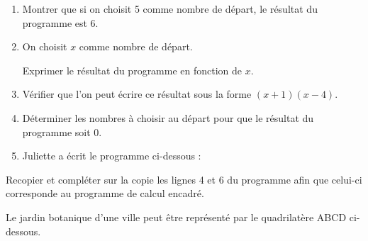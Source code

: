 \documentclass[a4paper,11pt]{article}
\newcommand{\exercice}[2]{%
  \newpage
  \noindent{\Large\bfseries Exercice #1\hspace{0.3em}{\normalfont\normalsize(#2 points)}}%
  \par\vspace{0.6cm}%
}
\begin{document}
\begin{enumerate}[itemsep=4pt]
  \item Montrer que si on choisit 5 comme nombre de départ, le résultat du programme est 6.
  \item On choisit $x$ comme nombre de départ.

  Exprimer le résultat du programme en fonction de $x$.
  \item Vérifier que l'on peut écrire ce résultat sous la forme $(x + 1)(x - 4)$.
  \item Déterminer les nombres à choisir au départ pour que le résultat du programme soit 0.
  \item Juliette a écrit le programme ci-dessous :

\begin{center}
\begin{scratch}
\end{scratch}
\end{center}
\end{enumerate}

\medskip

Recopier et compléter sur la copie les lignes 4 et 6 du programme afin que celui-ci corresponde au programme de calcul encadré.

\exercice{4}{7}

Le jardin botanique d'une ville peut être représenté par le quadrilatère ABCD ci-dessous.

\medskip
\end{document}
